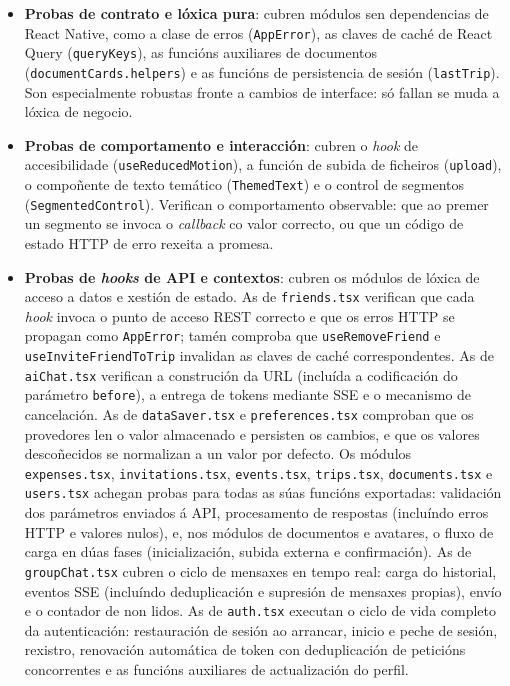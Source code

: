 \begin{itemize}
  \item \textbf{Probas de contrato e lóxica pura}: cubren módulos sen dependencias de React
        Native, como a clase de erros (\texttt{AppError}), as claves de caché de React Query
        (\texttt{queryKeys}), as funcións auxiliares de documentos
        (\texttt{documentCards.helpers}) e as funcións de persistencia de sesión
        (\texttt{lastTrip}). Son especialmente robustas fronte a cambios de interface: só
        fallan se muda a lóxica de negocio.

  \item \textbf{Probas de comportamento e interacción}: cubren o \textit{hook} de
        accesibilidade (\texttt{useReducedMotion}), a función de subida de ficheiros
        (\texttt{upload}), o compoñente de texto temático (\texttt{ThemedText}) e o control
        de segmentos (\texttt{SegmentedControl}). Verifican o comportamento observable: que
        ao premer un segmento se invoca o \textit{callback} co valor correcto, ou que un
        código de estado HTTP de erro rexeita a promesa.

  \item \textbf{Probas de \textit{hooks} de API e contextos}: cubren os módulos de lóxica
        de acceso a datos e xestión de estado. As de \texttt{friends.tsx} verifican que cada
        \textit{hook} invoca o punto de acceso REST correcto e que os erros HTTP se propagan
        como \texttt{AppError}; tamén comproba que \texttt{useRemoveFriend} e
        \texttt{useInviteFriendToTrip} invalidan as claves de caché correspondentes. As de
        \texttt{aiChat.tsx} verifican a construción da URL (incluída a codificación do
        parámetro \texttt{before}), a entrega de tokens mediante SSE e o mecanismo de
        cancelación. As de \texttt{dataSaver.tsx} e \texttt{preferences.tsx} comproban que os
        provedores len o valor almacenado e persisten os cambios, e que os valores
        descoñecidos se normalizan a un valor por defecto. Os módulos \texttt{expenses.tsx},
        \texttt{invitations.tsx}, \texttt{events.tsx}, \texttt{trips.tsx},
        \texttt{documents.tsx} e \texttt{users.tsx} achegan probas para todas as súas
        funcións exportadas: validación dos parámetros enviados á API, procesamento de
        respostas (incluíndo erros HTTP e valores nulos), e, nos módulos de documentos e
        avatares, o fluxo de carga en dúas fases (inicialización, subida externa e
        confirmación). As de \texttt{groupChat.tsx} cubren o ciclo de mensaxes en tempo real:
        carga do historial, eventos SSE (incluíndo deduplicación e supresión de mensaxes
        propias), envío e o contador de non lidos. As de \texttt{auth.tsx} executan o ciclo
        de vida completo da autenticación: restauración de sesión ao arrancar, inicio e peche
        de sesión, rexistro, renovación automática de token con deduplicación de peticións
        concorrentes e as funcións auxiliares de actualización do perfil.
\end{itemize}

